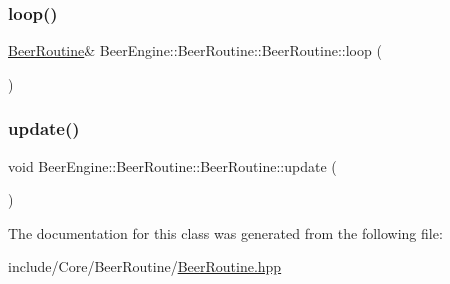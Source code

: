 \subsubsection{\texorpdfstring{loop()}{loop()}}
{\footnotesize\ttfamily \mbox{\hyperlink{class_beer_engine_1_1_beer_routine_1_1_beer_routine}{Beer\+Routine}}\& Beer\+Engine\+::\+Beer\+Routine\+::\+Beer\+Routine\+::loop (\begin{DoxyParamCaption}{ }\end{DoxyParamCaption})}

\mbox{\label{class_beer_engine_1_1_beer_routine_1_1_beer_routine_af210700097e82efb5c60ef68c73cb900}} 
\subsubsection{\texorpdfstring{update()}{update()}}
{\footnotesize\ttfamily void Beer\+Engine\+::\+Beer\+Routine\+::\+Beer\+Routine\+::update (\begin{DoxyParamCaption}{ }\end{DoxyParamCaption})}



The documentation for this class was generated from the following file\+:\begin{DoxyCompactItemize}
\item 
include/\+Core/\+Beer\+Routine/\mbox{\hyperlink{_beer_routine_8hpp}{Beer\+Routine.\+hpp}}\end{DoxyCompactItemize}
